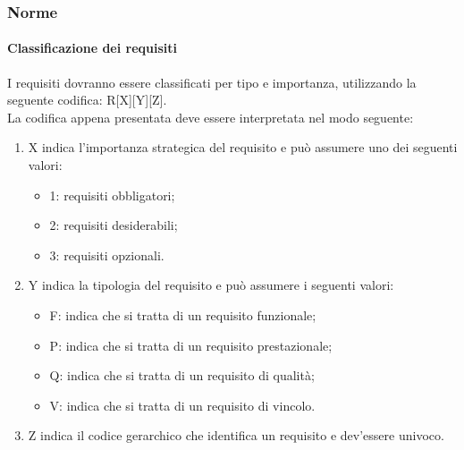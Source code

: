		\subsubsection{Norme}
			\paragraph{Classificazione dei requisiti}
				I requisiti dovranno essere classificati per tipo e importanza, utilizzando la seguente codifica: R[X][Y][Z].\\
				La codifica appena presentata deve essere interpretata nel modo seguente:
				\begin{enumerate}
					\item X indica l'importanza strategica del requisito e può assumere uno dei seguenti valori:
					\begin{itemize}
						\item 1: requisiti obbligatori;
						\item 2: requisiti desiderabili;
						\item 3: requisiti opzionali.
					\end{itemize}
					\item Y indica la tipologia del requisito e può assumere i seguenti valori:
					\begin{itemize}
						\item F: indica che si tratta di un requisito funzionale;
						\item P: indica che si tratta di un requisito prestazionale;
						\item Q: indica che si tratta di un requisito di qualità;
						\item V: indica che si tratta di un requisito di vincolo.
					\end{itemize}
					\item Z indica il codice gerarchico che identifica un requisito e dev'essere univoco.
				\end{enumerate}
